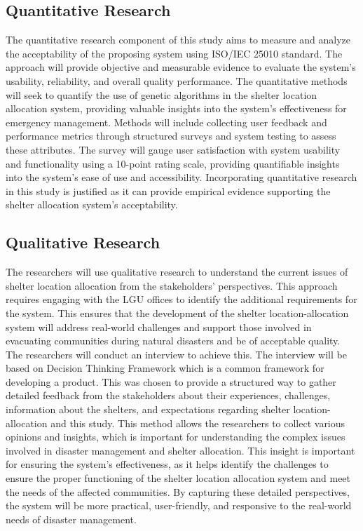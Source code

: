 \subsection{Quantitative Research}
	The quantitative research component of this study aims to measure and analyze the acceptability of the proposing system using ISO/IEC 25010 standard. The approach will provide objective and measurable evidence to evaluate the system's usability, reliability, and overall quality performance. The quantitative methods will seek to quantify the use of genetic algorithms in the shelter location allocation system, providing valuable insights into the system's effectiveness for emergency management.
	Methods will include collecting user feedback and performance metrics through structured surveys and system testing to assess these attributes. The survey will gauge user satisfaction with system usability and functionality using a 10-point rating scale, providing quantifiable insights into the system's ease of use and accessibility. 
	Incorporating quantitative research in this study is justified as it can provide empirical evidence supporting the shelter allocation system's acceptability. 

\subsection{Qualitative Research}
	The researchers will use qualitative research to understand the current issues of shelter location allocation from the stakeholders' perspectives. This approach requires engaging with the LGU offices to identify the additional requirements for the system. This ensures that the development of the shelter location-allocation system will address real-world challenges and support those involved in evacuating communities during natural disasters and be of acceptable quality.
	The researchers will conduct an interview to achieve this. The interview will be based on Decision Thinking Framework which is a common framework for developing a product. This was chosen to provide a structured way to gather detailed feedback from the stakeholders about their experiences, challenges, information about the shelters, and expectations regarding shelter location-allocation and this study. This method allows the researchers to collect various opinions and insights, which is important for understanding the complex issues involved in disaster management and shelter allocation.
	This insight is important for ensuring the system's effectiveness, as it helps identify the challenges to ensure the proper functioning of the shelter location allocation system and meet the needs of the affected communities. By capturing these detailed perspectives, the system will be more practical, user-friendly, and responsive to the real-world needs of disaster management.

